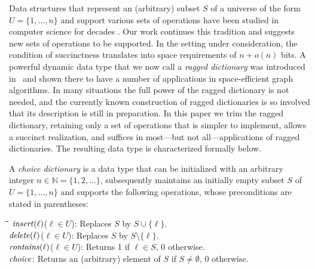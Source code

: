 \documentclass[envcountsame,envcountsect,undated,nolinenumbers]{lnthi}
\def\Tvn#1{\hbox{\textit{#1\/}}}
\def\TbbbN{\mathbb{N}}
\begin{document}
Data structures that represent an
(arbitrary) subset $S$ of a universe
of the form $U=\{1,\ldots,n\}$ and support various
sets of operations
have been studied in computer science for decades
\cite{Ajt88,AjtFK84,AndT07,BeaF02,BosDDHM13,DieKMHRT94,BoaKZ77,FiaN93,FreKS84,FreS89,FreW93,GupHSV07a,Joh82,PatT14,Ram96,Ruz08,TarY79,Tho00b,Wil84,Yao81}.
Our work continues this tradition and suggests
new sets of operations to be supported.
In the setting under consideration,
the condition of succinctness translates into space requirements
of $n+o(n)$ bits.
A powerful dynamic data type that we now call a
\emph{ragged dictionary}
was introduced in~\cite{ElmHK15}
and shown there to have a number of applications in
space-efficient graph algorithms.
In many situations the full power of the ragged
dictionary is not needed,
and the currently known construction of
ragged dictionaries is so involved that its
description is still in preparation.
In this paper we trim the ragged dictionary,
retaining only a set of operations that is simpler to
implement, allows a succinct realization,
and suffices in
most---but not all---applications of ragged dictionaries.
The resulting data type is characterized formally below.

\begin{definition}
\label{def:choice}A \emph{choice dictionary} is a data type that
can be initialized with an arbitrary integer
$n\in\TbbbN=\{1,2,\ldots\}$,
subsequently maintains
an initially empty subset $S$ of $U=\{1,\ldots,n\}$
and supports the following operations,
whose preconditions are stated in
parentheses:

\begin{tabbing}
\quad\=\hskip 2.4cm\=\hskip 2cm\=\kill
\>$\Tvn{insert}(\ell)$\>($\ell\in U$):\>
Replaces $S$ by $S\cup\{\ell\}$.\\
\>$\Tvn{delete}(\ell)$\>($\ell\in U$):\>
Replaces $S$ by $S\setminus\{\ell\}$.\\
\>$\Tvn{contains}(\ell)$\>($\ell\in U$):\>
Returns 1 if $\ell\in S$, 0 otherwise.\\
\>$\Tvn{choice}$:\>
\>Returns an (arbitrary) element of $S$
if $S\not=\emptyset$, 0 otherwise.
\end{tabbing}
\end{definition}
\end{document}
